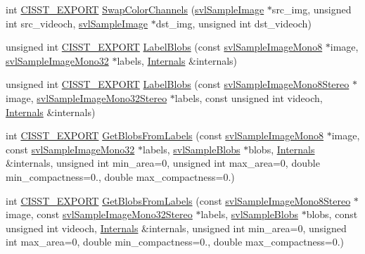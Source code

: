 \begin{DoxyCompactItemize}
\item 
int \hyperlink{cmn_export_macros_8h_a99393e0c3ac434b2605235bbe20684f8}{C\-I\-S\-S\-T\-\_\-\-E\-X\-P\-O\-R\-T} \hyperlink{namespacesvl_image_processing_a454ae19ad32cfb837dd13169a01d5d99}{Swap\-Color\-Channels} (\hyperlink{classsvl_sample_image}{svl\-Sample\-Image} $\ast$src\-\_\-img, unsigned int src\-\_\-videoch, \hyperlink{classsvl_sample_image}{svl\-Sample\-Image} $\ast$dst\-\_\-img, unsigned int dst\-\_\-videoch)
\item 
unsigned int \hyperlink{cmn_export_macros_8h_a99393e0c3ac434b2605235bbe20684f8}{C\-I\-S\-S\-T\-\_\-\-E\-X\-P\-O\-R\-T} \hyperlink{namespacesvl_image_processing_ab67a8fcff51b4dbddda68a51697ea222}{Label\-Blobs} (const \hyperlink{svl_sample_image_types_8h_a812ff42c7181179f558b68c43eeacee5}{svl\-Sample\-Image\-Mono8} $\ast$image, \hyperlink{svl_sample_image_types_8h_ac5d9d107eabb65b55f67d2a70ccf2cd6}{svl\-Sample\-Image\-Mono32} $\ast$labels, \hyperlink{classsvl_image_processing_1_1_internals}{Internals} \&internals)
\item 
unsigned int \hyperlink{cmn_export_macros_8h_a99393e0c3ac434b2605235bbe20684f8}{C\-I\-S\-S\-T\-\_\-\-E\-X\-P\-O\-R\-T} \hyperlink{namespacesvl_image_processing_a03a2903ed508d4db0f8d21517d03344e}{Label\-Blobs} (const \hyperlink{svl_sample_image_types_8h_a40d6fa6c50215a4f52a8027a42eef1d9}{svl\-Sample\-Image\-Mono8\-Stereo} $\ast$image, \hyperlink{svl_sample_image_types_8h_a31510d38b03e3baeedb79e24fe3c7d0b}{svl\-Sample\-Image\-Mono32\-Stereo} $\ast$labels, const unsigned int videoch, \hyperlink{classsvl_image_processing_1_1_internals}{Internals} \&internals)
\item 
int \hyperlink{cmn_export_macros_8h_a99393e0c3ac434b2605235bbe20684f8}{C\-I\-S\-S\-T\-\_\-\-E\-X\-P\-O\-R\-T} \hyperlink{namespacesvl_image_processing_a6831b99429115d0e46283e0f423c4c6a}{Get\-Blobs\-From\-Labels} (const \hyperlink{svl_sample_image_types_8h_a812ff42c7181179f558b68c43eeacee5}{svl\-Sample\-Image\-Mono8} $\ast$image, const \hyperlink{svl_sample_image_types_8h_ac5d9d107eabb65b55f67d2a70ccf2cd6}{svl\-Sample\-Image\-Mono32} $\ast$labels, \hyperlink{classsvl_sample_blobs}{svl\-Sample\-Blobs} $\ast$blobs, \hyperlink{classsvl_image_processing_1_1_internals}{Internals} \&internals, unsigned int min\-\_\-area=0, unsigned int max\-\_\-area=0, double min\-\_\-compactness=0., double max\-\_\-compactness=0.)
\item 
int \hyperlink{cmn_export_macros_8h_a99393e0c3ac434b2605235bbe20684f8}{C\-I\-S\-S\-T\-\_\-\-E\-X\-P\-O\-R\-T} \hyperlink{namespacesvl_image_processing_ab99d41836ca0a0aac47b00a1c803bb76}{Get\-Blobs\-From\-Labels} (const \hyperlink{svl_sample_image_types_8h_a40d6fa6c50215a4f52a8027a42eef1d9}{svl\-Sample\-Image\-Mono8\-Stereo} $\ast$image, const \hyperlink{svl_sample_image_types_8h_a31510d38b03e3baeedb79e24fe3c7d0b}{svl\-Sample\-Image\-Mono32\-Stereo} $\ast$labels, \hyperlink{classsvl_sample_blobs}{svl\-Sample\-Blobs} $\ast$blobs, const unsigned int videoch, \hyperlink{classsvl_image_processing_1_1_internals}{Internals} \&internals, unsigned int min\-\_\-area=0, unsigned int max\-\_\-area=0, double min\-\_\-compactness=0., double max\-\_\-compactness=0.)

\end{DoxyCompactItemize}

